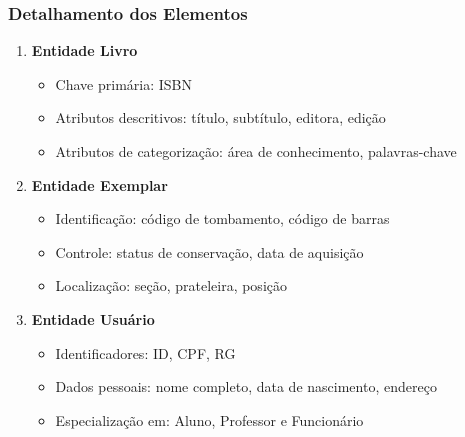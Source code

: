 \documentclass[12pt,a4paper]{article}
\begin{document}
\subsubsection{Detalhamento dos Elementos}
\begin{tcolorbox}[title=Elementos do Diagrama]
\begin{enumerate}
    \item \textbf{Entidade Livro}
    \begin{itemize}
        \item Chave primária: ISBN
        \item Atributos descritivos: título, subtítulo, editora, edição
        \item Atributos de categorização: área de conhecimento, palavras-chave
    \end{itemize}

    \item \textbf{Entidade Exemplar}
    \begin{itemize}
        \item Identificação: código de tombamento, código de barras
        \item Controle: status de conservação, data de aquisição
        \item Localização: seção, prateleira, posição
    \end{itemize}

    \item \textbf{Entidade Usuário}
    \begin{itemize}
        \item Identificadores: ID, CPF, RG
        \item Dados pessoais: nome completo, data de nascimento, endereço
        \item Especialização em: Aluno, Professor e Funcionário
    \end{itemize}


\end{enumerate}
\end{tcolorbox}
\end{document}
